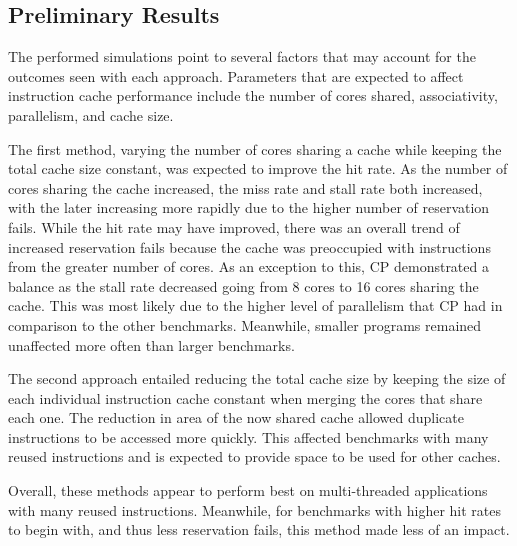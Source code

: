 \subsection{Preliminary Results}

The performed simulations point to several factors that may account 
for the outcomes seen with each approach. Parameters that are expected 
to affect instruction cache performance include the number of cores 
shared, associativity, parallelism, and cache size.

The first method, varying the number of cores sharing a cache while 
keeping the total cache size constant, was expected to improve the hit 
rate. As the number of cores sharing the cache increased, the miss rate 
and stall rate both increased, with the later increasing more rapidly 
due to the higher number of reservation fails. While the hit rate may 
have improved, there was an overall trend of increased reservation fails 
because the cache was preoccupied with instructions from the greater 
number of cores. As an exception to this, CP demonstrated a balance as 
the stall rate decreased going from 8 cores to 16 cores sharing the 
cache. This was most likely due to the higher level of parallelism that 
CP had in comparison to the other benchmarks. Meanwhile, smaller programs 
remained unaffected more often than larger benchmarks.

The second approach entailed reducing the total cache size by keeping 
the size of each individual instruction cache constant when merging the 
cores that share each one. The reduction in area of the now shared cache 
allowed duplicate instructions to be accessed more quickly. This 
affected benchmarks with many reused instructions and is expected to 
provide space to be used for other caches.

Overall, these methods appear to perform best on multi-threaded 
applications with many reused instructions. Meanwhile, for benchmarks 
with higher hit rates to begin with, and thus less reservation fails, 
this method made less of an impact.
